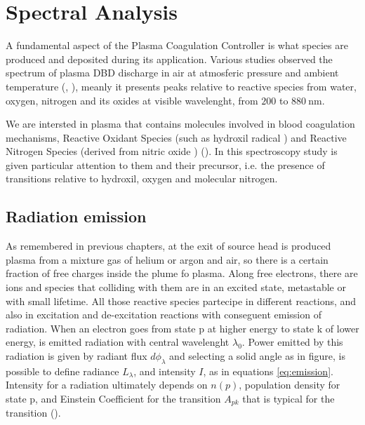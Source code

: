 \chapter{Spectral Analysis}
\label{ch:spettro}
A fundamental aspect of the Plasma Coagulation Controller is what species are produced and deposited during its application. Various studies observed the spectrum of plasma DBD discharge in air at atmosferic pressure and ambient temperature (\cite{DBDair_Trot}, \cite{DBDAirTypicalSpec}), meanly it presents peaks relative to reactive species from water, oxygen, nitrogen and its oxides at visible wavelenght, from $\num{200}$ to $\SI{880}{\nano\meter}$.

We are intersted in plasma that contains molecules involved in blood coagulation mechanisms, Reactive Oxidant Species (such as hydroxil radical ) and Reactive Nitrogen Species (derived from nitric oxide ) (\cite{6153386}). In this spectroscopy study is given particular attention to them and their precursor, i.e. the presence of transitions relative to hydroxil, oxygen and molecular nitrogen.


\section{Radiation emission}
As remembered in previous chapters, at the exit of source head is produced plasma from a mixture gas of helium or argon and air, so there is a certain fraction of free charges inside the plume fo plasma. Along free electrons, there are ions and species that colliding with them are in an excited state, metastable or with small lifetime. All those reactive species partecipe in different reactions, and also in excitation and de-excitation reactions with conseguent emission of radiation. When an electron goes from state p at higher energy to state k of lower energy, is emitted radiation with central wavelenght $\lambda_0$. Power emitted by this radiation is given by radiant flux $d\phi_{\lambda}$ and selecting a solid angle as in figure, is possible to define radiance $L_{\lambda}$, and intensity $I$, as in equations \ref{eq:emission}. Intensity for a radiation ultimately depends on $n(p)$, population density for state p, and Einstein Coefficient for the transition $A_{pk}$ that is typical for the transition (\cite{book:291477}).

